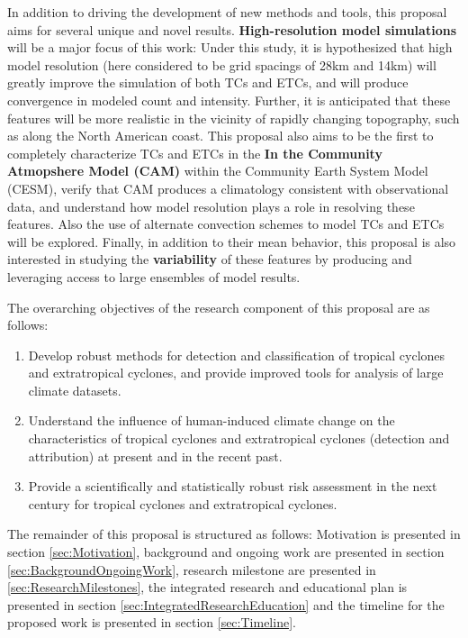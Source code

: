 \documentclass[11pt]{article}
\begin{document}
In addition to driving the development of new methods and tools, this proposal aims for several unique and novel results.  \textbf{High-resolution model simulations} will be a major focus of this work:  Under this study, it is hypothesized that high model resolution (here considered to be grid spacings of 28km and 14km) will greatly improve the simulation of both TCs and ETCs, and will produce convergence in modeled count and intensity.  Further, it is anticipated that these features will be more realistic in the vicinity of rapidly changing topography, such as along the North American coast.  This proposal also aims to be the first to completely characterize TCs and ETCs in the \textbf{In the Community Atmopshere Model (CAM)} within the Community Earth System Model (CESM), verify that CAM produces a climatology consistent with observational data, and understand how model resolution plays a role in resolving these features.  Also the use of alternate convection schemes to model TCs and ETCs will be explored.  Finally, in addition to their mean behavior, this proposal is also interested in studying the \textbf{variability} of these features by producing and leveraging access to large ensembles of model results.

The overarching objectives of the research component of this proposal are as follows:

\begin{enumerate}
\item Develop robust methods for detection and classification of tropical cyclones and extratropical cyclones, and provide improved tools for analysis of large climate datasets.

\item Understand the influence of human-induced climate change on the characteristics of tropical cyclones and extratropical cyclones (detection and attribution) at present and in the recent past.

\item Provide a scientifically and statistically robust risk assessment in the next century for tropical cyclones and extratropical cyclones.
\end{enumerate}

The remainder of this proposal is structured as follows: Motivation is presented in section \ref{sec:Motivation}, background and ongoing work are presented in section \ref{sec:BackgroundOngoingWork}, research milestone are presented in \ref{sec:ResearchMilestones}, the integrated research and educational plan is presented in section \ref{sec:IntegratedResearchEducation} and the timeline for the proposed work is presented in section \ref{sec:Timeline}.
\end{document}
